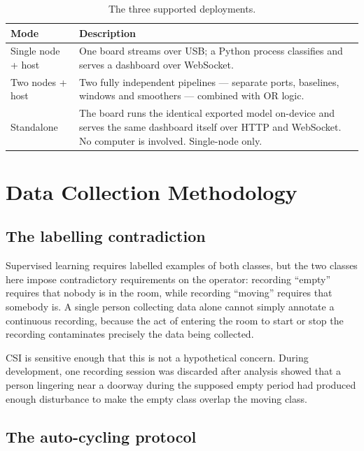 \documentclass[11pt,a4paper]{article}
\begin{document}
\begin{table}[H]
\centering
\caption{The three supported deployments.}
\begin{tabularx}{\linewidth}{@{}lX@{}}
\toprule
\textbf{Mode} & \textbf{Description} \\
\midrule
Single node + host & One board streams over USB; a Python process classifies and
serves a dashboard over WebSocket. \\
Two nodes + host   & Two fully independent pipelines --- separate ports,
baselines, windows and smoothers --- combined with OR logic. \\
Standalone         & The board runs the identical exported model on-device and
serves the same dashboard itself over HTTP and WebSocket. No computer is
involved. Single-node only. \\
\bottomrule
\end{tabularx}
\end{table}

\section{Data Collection Methodology}
\label{sec:data}

\subsection{The labelling contradiction}

Supervised learning requires labelled examples of both classes, but the two
classes here impose contradictory requirements on the operator: recording
``empty'' requires that nobody is in the room, while recording ``moving''
requires that somebody is. A single person collecting data alone cannot
simply annotate a continuous recording, because the act of entering the room to
start or stop the recording contaminates precisely the data being collected.

CSI is sensitive enough that this is not a hypothetical concern. During
development, one recording session was discarded after analysis showed that a
person lingering near a doorway during the supposed empty period had produced
enough disturbance to make the empty class overlap the moving class.

\subsection{The auto-cycling protocol}
\end{document}
